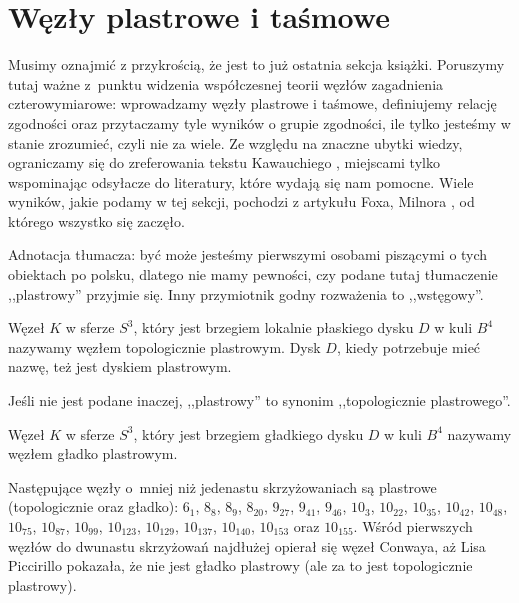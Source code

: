 
\section{Węzły plastrowe i taśmowe}
\label{sec:slice}
Musimy oznajmić z przykrością, że jest to już ostatnia sekcja książki.
Poruszymy tutaj ważne z~punktu widzenia współczesnej teorii węzłów zagadnienia czterowymiarowe: wprowadzamy węzły plastrowe i taśmowe, definiujemy relację zgodności oraz przytaczamy tyle wyników o grupie zgodności, ile tylko jesteśmy w stanie zrozumieć, czyli nie za wiele.
Ze względu na znaczne ubytki wiedzy, ograniczamy się do zreferowania tekstu Kawauchiego \cite[s. 154-169]{kawauchi1996}, miejscami tylko wspominając odsyłacze do literatury, które wydają się nam pomocne.
Wiele wyników, jakie podamy w tej sekcji, pochodzi z artykułu Foxa, Milnora \cite{fox1966}, od którego wszystko się zaczęło.
%
%


Adnotacja tłumacza: być może jesteśmy pierwszymi osobami piszącymi o tych obiektach po polsku, dlatego nie mamy pewności, czy podane tutaj tłumaczenie ,,plastrowy'' przyjmie się.
Inny przymiotnik godny rozważenia to ,,wstęgowy''.

\begin{definition}
%
    Węzeł $K$ w sferze $S^3$, który jest brzegiem lokalnie płaskiego dysku $D$ w kuli $B^4$ nazywamy węzłem topologicznie plastrowym. %
    Dysk $D$, kiedy potrzebuje mieć nazwę, też jest dyskiem plastrowym.
\end{definition}

Jeśli nie jest podane inaczej, ,,plastrowy'' to synonim ,,topologicznie plastrowego''.

\begin{definition}
    Węzeł $K$ w sferze $S^3$, który jest brzegiem gładkiego dysku $D$ w kuli $B^4$ nazywamy węzłem gładko plastrowym.
\end{definition}

Następujące węzły o~mniej niż jedenastu skrzyżowaniach są plastrowe (topologicznie oraz gładko): $6_1$, $8_{8}$, $8_{9}$, $8_{20}$, $9_{27}$, $9_{41}$, $9_{46}$, $10_{3}$, $10_{22}$, $10_{35}$, $10_{42}$, $10_{48}$, $10_{75}$, $10_{87}$, $10_{99}$, $10_{123}$, $10_{129}$, $10_{137}$, $10_{140}$, $10_{153}$ oraz $10_{155}$.
Wśród pierwszych węzłów do dwunastu skrzyżowań najdłużej opierał się węzeł Conwaya, aż Lisa Piccirillo \cite{piccirillo2020} pokazała, że nie jest gładko plastrowy (ale za to jest topologicznie plastrowy).
%

